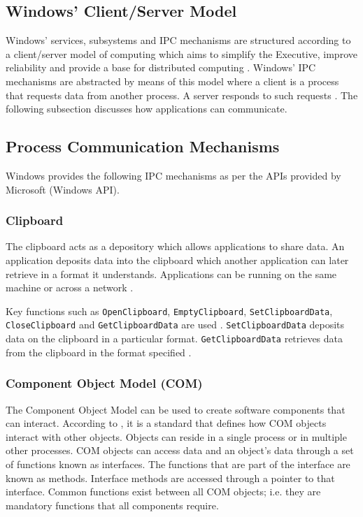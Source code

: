 \documentclass[12pt,a4paper,oneside]{article}
\def\code#1{\texttt{#1}}
\begin{document}
\begin{spacing}{1.4}
\subsection{Windows' Client/Server Model}
Windows' services, subsystems and IPC mechanisms are structured according to a client/server model of computing which aims to simplify the Executive, improve reliability and provide a base for distributed computing \citep{OSInternals&DesignPrinciplesStallings}. Windows' IPC mechanisms are abstracted by means of this model where a client is a process that requests data from another process. A server responds to such requests \citep{MSDN_IPCExplanation}. The following subsection discusses how applications can communicate.
\subsection{Process Communication Mechanisms}
Windows provides the following IPC mechanisms as per the APIs provided by Microsoft (Windows API).
\subsubsection{Clipboard}
The clipboard acts as a depository which allows applications to share data. An application deposits data into the clipboard which another application can later retrieve in a format it understands. Applications can be running on the same machine or across a network \citep{MSDN_IPCExplanation}.

Key functions such as \code{OpenClipboard}, \code{EmptyClipboard}, \code{SetClipboardData}, \code{CloseClipboard} and \code{GetClipboardData} are used \citep{IPCWindowsLinkedInSlides}. \code{SetClipboardData} deposits data on the clipboard in a particular format. \code{GetClipboardData} retrieves data from the clipboard in the format specified \citep{MSDN_API}.
\subsubsection{Component Object Model (COM)}
The Component Object Model can be used to create software components that can interact. According to \cite{MSDN_API}, it is a standard that defines how COM objects interact with other objects. Objects can reside in a single process or in multiple other processes. COM objects can access data and an object's data through a set of functions known as interfaces. The functions that are part of the interface are known as methods. Interface methods are accessed through a pointer to that interface. Common functions exist between all COM objects; i.e. they are mandatory functions that all components require.

\end{spacing}
\end{document}

